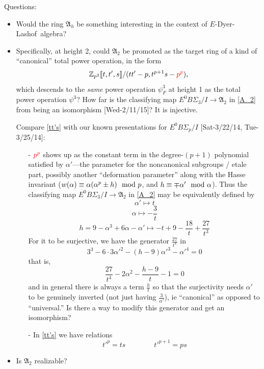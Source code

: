 \documentclass{rs}
\theoremstyle{definition}
\theoremstyle{remark}
\newcommand{\mb}[1]{\mathbb{#1}}
\newcommand{\mf}[1]{\mathfrak{#1}}
\newcommand{\DL}{Dyer-Lashof~}
\newcommand{\BZ}{{\mb Z}}
\newcommand{\md}{~~{\rm mod}~}
\newcommand{\A}{\alpha}
\newcommand{\p}{\psi^3}
\renewcommand{\=}{\approx}
\renewcommand{\-}{\sim}
\numberwithin{equation}{section}
\numberwithin{thm}{section}
\begin{document}
Questions: 
\begin{itemize}
 \item Would the ring $\mf A_h$ be something interesting in the context of $E$-\DL algebra?  

 \item Specifically, at height 2, could $\mf A_2$ be promoted as the target ring of a kind of ``canonical'' total power operation, 
 in the form 
 \begin{equation}
 \label{tt's}
  \BZ_{p^2} \llbracket t, t', s \rrbracket / (t t' - p, t^{p+1} s - \textcolor{red}{p^p}), 
 \end{equation}
 which descends to the {\em same} power operation $\p_F$ at height 1 as the total power operation $\p$?  
 How far is the classifying map $E^0 B\Sigma_3 / I \to {\mf A_2}$ in \eqref{A_2} from being an isomorphism [Wed-2/11/15]?  
 It is injective.  

 Compare \eqref{tt's} with our known presentations for $E^0 B\Sigma_p / I$ [Sat-3/22/14, Tue-3/25/14]: 
 \begin{itemize}
  \item[-] $\textcolor{red}{p^p}$ shows up as the constant term in the degree-$(p+1)$ polynomial 
  satisfied by $\A'$---the parameter for the noncanonical subgroups / etale part, 
  possibly another ``deformation parameter'' along with the Hasse invariant 
  ($w(\A) \equiv \A (\A^p \pm h) \md p$, and $h \equiv \mp \A' \md \A$).  
  Thus the classifying map $E^0 B\Sigma_3 / I \to {\mf A_2}$ in \eqref{A_2} may be equivalently defined by 
  \[
   \A' \mapsto t 
  \]
  \[
   \A \mapsto -\frac{3}{t} 
  \]
  \[
   h = 9 - \A^3 + 6 \A - \A' \mapsto -t + 9 - \frac{18}{t} + \frac{27}{t^3} 
  \]
  For it to be surjective, we have the generator $\frac{27}{t^4}$ in 
  \[
   3^3 - 6 \cdot 3 \A'^2 - (h - 9) \A'^3 - \A'^4 = 0 
  \]
  that is, 
  \[
   \frac{27}{t^4} - 2 \A^2 - \frac{h - 9}{t} - 1 = 0 
  \]
  and in general there is always a term $\frac{h}{t}$ 
  so that the surjectivity needs $\A'$ to be genuinely inverted 
  (not just having $\frac{3}{\A'}$), ie ``canonical'' as opposed to ``universal.''  
  Is there a way to modify this generator and get an isomorphism?  

  \item[-] In \eqref{tt's} we have relations 
  \[
   t'^p = t s \qquad\qquad t'^{p+1} = p s 
  \]
 \end{itemize}

 \item Is $\mf A_2$ realizable?  
\end{itemize}
\end{document}
